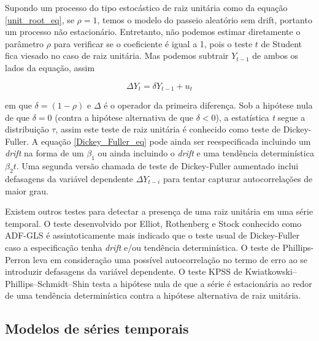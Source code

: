 \documentclass[twocolumn]{rbef}
\newcommand{\1}{\mathbbm{1}}
\begin{document}
Supondo um processo do tipo estocástico de raiz unitária como da equação \ref{unit_root_eq}, se $\rho = 1$, temos o modelo do passeio aleatório sem drift, portanto um processo não estacionário. Entretanto, não podemos estimar diretamente o parâmetro $\rho$ para verificar se o coeficiente é igual a 1, pois o teste $t$ de Student fica viesado no caso de raiz unitária. Mas podemos subtrair $Y_{t-1}$ de ambos os lados da equação, assim

\begin{equation} \label{Dickey_Fuller_eq}
    \Delta Y_{t} = \delta Y_{t-1} + u_{t}
\end{equation}

em que $\delta = (1-\rho)$ e $\Delta$ é o operador da primeira diferença. Sob a hipótese nula de que $\delta = 0$ (contra a hipótese alternativa de que $\delta < 0$), a estatística \textit{t} segue a distribuição $\tau$\cite{Dicker-Fuller}, assim este teste de raiz unitária é conhecido como teste de Dickey-Fuller. A equação \ref{Dickey_Fuller_eq} pode ainda ser reespecificada incluindo um \textit{drift} na forma de um $\beta_{1}$ ou ainda incluindo o \textit{drift} e uma tendência determinística $\beta_{2}t$. Uma segunda versão chamada de teste de Dickey-Fuller aumentado inclui defasagens da variável dependente $\Delta Y_{t-i}$ para tentar capturar autocorrelações de maior grau.

Existem outros testes para detectar a presença de uma raiz unitária em uma série temporal. O teste desenvolvido por Elliot, Rothenberg e Stock\cite{Elliot-Rothenberg-Stock} conhecido como ADF-GLS é assintoticamente mais indicado que o teste usual de Dickey-Fuller caso a especificação tenha \textit{drift} e/ou tendência determinística. O teste de Phillips-Perron\cite{Phillips-Perron} leva em consideração uma possível autocorrelação no termo de erro ao se introduzir defasagens da variável dependente. O teste KPSS de Kwiatkowski–Phillips–Schmidt–Shin\cite{Kwiatkowski} testa a hipótese nula de que a série é estacionária ao redor de uma tendência determinística contra a hipótese alternativa de raiz unitária.

\subsection{Modelos de séries temporais} \label{arima}
\end{document}
